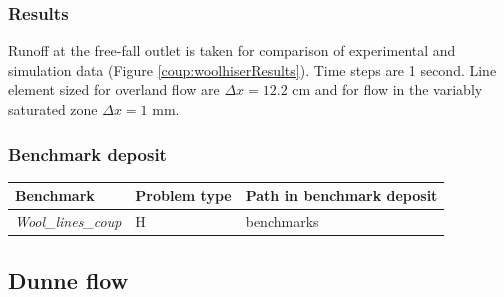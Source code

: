 %
\subsubsection*{Results}
%
Runoff at the free-fall outlet is taken for comparison of experimental and simulation data (Figure \ref{coup:woolhiserResults}).
Time steps are 1 second. Line element sized for overland flow are $\Delta x = 12.2$ cm and for
flow in the variably saturated zone $\Delta x = 1$ mm.
%
\subsubsection*{Benchmark deposit}
%
\begin{tabular}{|l|l|l|}
  \hline
  Benchmark & Problem type & Path in benchmark deposit \\
  \hline
  \emph{Wool\_lines\_coup} & H & benchmarks\verb \COUPLED_FLOW\ \\
  \hline
\end{tabular}
%
\subsection{Dunne flow}
\label{sec:CoupAbdul}
%
